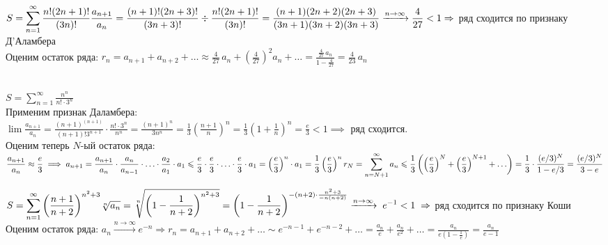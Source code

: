 \documentclass[a4paper]{article}
\begin{document}
    \begin{problem}
        $\displaystyle S = \sum_{n = 1}^{\infty} \frac{n! (2n + 1)!}{(3n)!}
        \\[4 pt]
        \frac{a_{n+1}}{a_n} = \frac{(n + 1)! (2n + 3)!}{(3n + 3)!} \div \frac{n! (2n + 1)!}{(3n)!} = 
        \frac{(n + 1)(2n + 2)(2n + 3)}{(3n + 1)(3n + 2)(3n + 3)} \xrightarrow{n \to \infty} \frac{4}{27} < 1 \Rightarrow$ 
        ряд сходится по признаку Д'Аламбера
        \\[4 pt]
        Оценим остаток ряда: $\displaystyle r_n = a_{n+1} + a_{n+2} + \dots \approx 
        \frac{4}{27} \, a_n + {\left(\frac{4}{27}\right)}^2 a_n + \dots = 
        \frac{\frac4{27} \, a_n}{1 - \frac4{27}} = \frac{4}{23} \, a_n$
    \end{problem}
    
    \begin{problem}
        \ \\
        $\displaystyle
        S = \sum\limits_{n=1}^{\infty}\frac{n^n}{n!\cdot3^n}$\\[3pt]
        Применим признак Даламбера:\\[3pt]
        $\displaystyle\lim\frac{a_{n + 1}}{a_n} = \frac{(n+1)^{(n+1)}}{(n+1)!3^{n+1}} \cdot \frac{n!\cdot3^n}{n^n} = \frac{(n+1)^{n}}{3n^n} =
        \frac{1}{3}\left(\frac{n + 1}{n}\right)^n =\frac{1}{3}\left(1+\frac{1}{n}\right)^n = \frac{e}{3} < 1 \implies
        $ ряд сходится.\\[3pt]
        Оценим теперь $N$-ый остаток ряда:\\[3pt]
        $\displaystyle
        \frac{a_{n + 1}}{a_n} \approx \frac{e}{3} \implies a_{n+1} =
        \frac{a_{n+1}}{a_n}\cdot\frac{a_{n}}{a_{n-1}}\cdot\ldots\cdot\frac{a_{2}}{a_1}\cdot a_1
        \leq \frac{e}{3}\cdot\frac{e}{3}\cdot\ldots\cdot\frac{e}{3}\cdot a_1 = \left(\frac{e}{3}\right)^n\cdot a_1=
        \frac{1}{3}\left(\frac{e}{3}\right)^n\\[3pt]
        r_N=\sum_{n = N+1}^{\infty}a_n \leq
        \frac{1}{3}\left( \left(\frac{e}{3}\right)^{N} + \left(\frac{e}{3}\right)^{N+1} + \ldots\right)=
        \frac{1}{3}\cdot\frac{(e/3)^N}{1 - e/3} =\frac{(e/3)^N}{3 - e}
        $
    \end{problem}
    
    \begin{problem}
        $\displaystyle S = \sum_{n = 1}^{\infty} {\left(\frac{n + 1}{n + 2}\right)}^{n^2 + 3}
        \\[4 pt]
        \sqrt[n]{a_n} = \sqrt[n]{{\left( 1 - \frac{1}{n + 2} \right)}^{n^2 + 3}} = 
        {\left( 1 - \frac{1}{n + 2} \right)}^{-(n + 2) \cdot \frac{n^2 + 3}{-n(n + 2)}} 
        \xrightarrow{n \to \infty} \; e^{-1} < 1 \; \Rightarrow$ ряд сходится по признаку Коши
        \\[4 pt]
        Оценим остаток ряда: $\displaystyle a_n \xrightarrow{n \to \infty} e^{-n} \Rightarrow r_n = 
        a_{n+1} + a_{n+2} + \dots \sim e^{-n-1} + e^{-n-2} + \dots = 
        \frac{a_n}{e} + \frac{a_n}{e^2} + \dots = \frac{a_n}{e \left(1 - \frac1e \right)} = \frac{a_n}{e - 1}$
    \end{problem}
    
\end{document}
